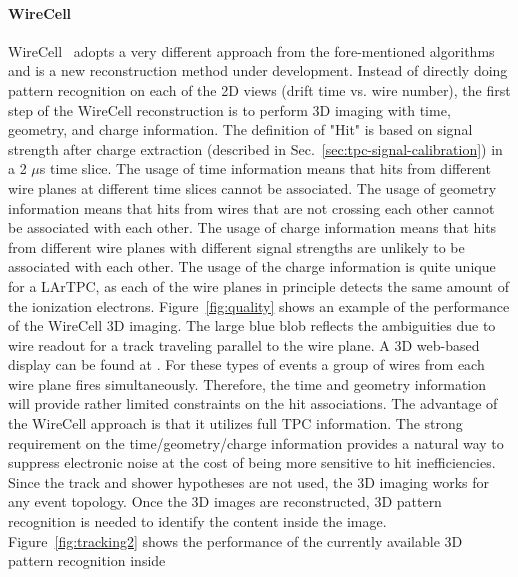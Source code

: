 \paragraph{WireCell}
WireCell~\cite{wire-cell} adopts a very different approach from the 
fore-mentioned algorithms and is a new reconstruction method under development.
Instead of directly doing pattern recognition on each of the 2D views (drift 
time vs. wire number), the first step of the WireCell reconstruction is to 
perform 3D imaging with time, geometry, and charge information. The definition
of "Hit" is based on signal strength after charge extraction (described in 
Sec.~\ref{sec:tpc-signal-calibration}) in a 2 $\mu$s time slice. The usage of 
time information means that hits from different wire planes at different time 
slices cannot be associated. The usage of geometry information means that hits
from wires that are not crossing each other cannot be associated with each other. 
The usage of charge information means that hits from different wire planes
with different signal strengths are unlikely to be associated with each other. The 
usage of the charge information is quite unique for a LArTPC, as each of the 
wire planes in principle detects the same amount of the ionization electrons. 
Figure~\ref{fig:quality} shows an example of the performance of the WireCell 3D imaging. 
The large blue blob reflects the ambiguities due to wire readout for a track
traveling parallel to the wire plane. A 3D web-based 
display can be found at \cite{ref:wirecell-3D}. 
For these types of events a group of wires from each 
wire plane fires simultaneously. Therefore, the time and geometry 
information will provide rather limited constraints on the hit associations.
The advantage of the WireCell approach is that it utilizes full TPC 
information. The strong requirement 
on the time/geometry/charge information
provides a natural way to suppress electronic noise at the cost of being more
sensitive to hit inefficiencies.
 Since the track and shower hypotheses
are not used, the 3D imaging works for any event topology. Once the 3D
images are reconstructed, 3D pattern recognition is needed to identify 
the content inside the image. Figure~\ref{fig:tracking2} shows the 
performance of the currently available 3D pattern recognition inside
